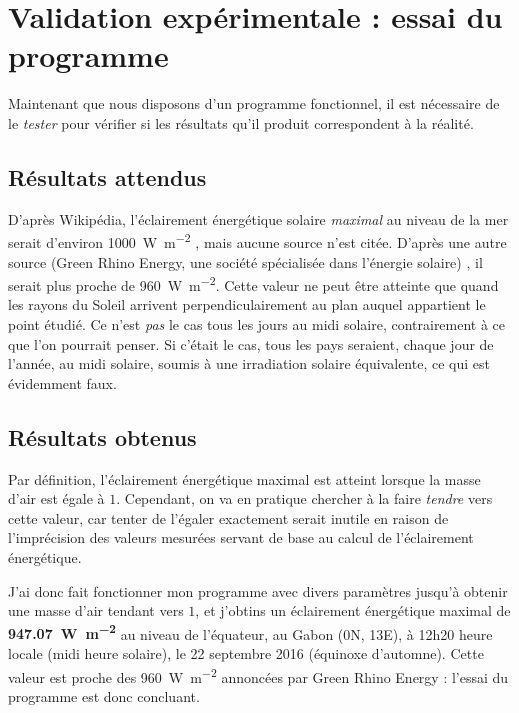 \documentclass[12pt]{article}
\begin{document}
\clearpage
\section{Validation expérimentale : essai du programme}

Maintenant que nous disposons d'un programme fonctionnel, il est nécessaire de le \emph{tester} pour vérifier si les résultats qu'il produit correspondent à la réalité.

\subsection{Résultats attendus}

D'après Wikipédia, l'éclairement énergétique solaire \emph{maximal} au niveau de la mer serait d'environ \SI{1000}{\watt\per\square\meter} \cite{earth_irradiance_wiki}, mais aucune source n'est citée.
D'après une autre source (Green Rhino Energy, une société spécialisée dans l'énergie solaire) \cite{green_rhino_irradiance}, il serait plus proche de \SI{960}{\watt\per\square\meter}.
Cette valeur ne peut être atteinte que quand les rayons du Soleil arrivent perpendiculairement au plan auquel appartient le point étudié.
Ce n'est \emph{pas} le cas tous les jours au midi solaire, contrairement à ce que l'on pourrait penser.
Si c'était le cas, tous les pays seraient, chaque jour de l'année, au midi solaire, soumis à une irradiation solaire équivalente, ce qui est évidemment faux.


\subsection{Résultats obtenus}

Par définition, l'éclairement énergétique maximal est atteint lorsque la masse d'air est égale à $1$.
Cependant, on va en pratique chercher à la faire \emph{tendre} vers cette valeur, car tenter de l'égaler exactement serait inutile en raison de l'imprécision des valeurs mesurées servant de base au calcul de l'éclairement énergétique.

J'ai donc fait fonctionner mon programme avec divers paramètres jusqu'à obtenir une masse d'air tendant vers $1$, et j'obtins un éclairement énergétique maximal de \textbf{\SI{947.07}{\watt\per\square\meter}} au niveau de l'équateur, au Gabon (0\degree N, 13\degree E), à 12h20 heure locale (midi heure solaire), le 22 septembre 2016 (équinoxe d'automne).
Cette valeur est proche des \SI{960}{\watt\per\square\meter} annoncées par Green Rhino Energy : l'essai du programme est donc concluant.
\end{document}
